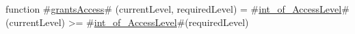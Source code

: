 function #\hyperref[zgrantsAccess]{grantsAccess}# (currentLevel, requiredLevel) =
  #\hyperref[zintzyofzyAccessLevel]{int\_of\_AccessLevel}#(currentLevel) >= #\hyperref[zintzyofzyAccessLevel]{int\_of\_AccessLevel}#(requiredLevel)
